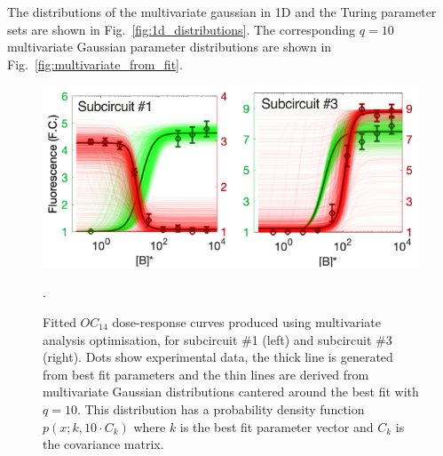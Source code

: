 The distributions of the multivariate gaussian in 1D and the Turing parameter sets are shown in Fig.~\ref{fig:1d_distributions}.
The corresponding $q=10$ multivariate Gaussian parameter distributions are shown in Fig.~\ref{fig:multivariate_from_fit}.
\begin{figure}[H] %
    \centering
    \begin{adjustbox}{center}
        \includegraphics[width=1\textwidth]{chapters/Chapter 2/dose_response_multivariate_gaussian} %
    \end{adjustbox}
    \caption{Fitted $OC_14$ dose-response curves produced using multivariate analysis optimisation, for subcircuit \#1 (left) and subcircuit \#3 (right). Dots show experimental data, the thick line is generated from best fit parameters and the thin lines are derived from multivariate Gaussian distributions cantered around the best fit with $q=10$. This distribution has a probability density function $p(x;k,10\cdot C_{k})$ where $k$ is the best fit parameter vector and $C_{k}$ is the covariance matrix.}.
    \label{fig:dose_response_multivariate_gaussian} %
\end{figure}


